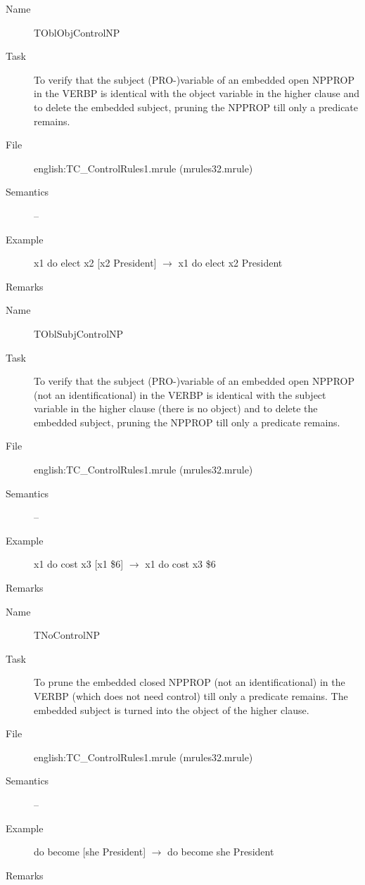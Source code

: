 \begin{description}
\vspace{1 cm}
\begin{description}
\item[Name] TOblObjControlNP
\item[Task] To verify that  the subject (PRO-)variable of an embedded 
open NPPROP in the VERBP is identical with the object variable in the 
higher clause 
and to delete the embedded subject, pruning the NPPROP till only a predicate 
remains. 
\item[File] english:TC\_ControlRules1.mrule (mrules32.mrule)
\item[Semantics] --
\item[Example] x1 do elect x2 [x2 President] $\rightarrow$ x1 do elect x2 
President
\item[Remarks] 
\end{description}

\vspace{1 cm}
\begin{description}
\item[Name]   TOblSubjControlNP
\item[Task] To verify that  the subject (PRO-)variable of an embedded 
open NPPROP (not an identificational) in the VERBP is 
identical with the subject variable in the higher clause (there is no object)
and to delete the embedded subject, pruning the NPPROP till only a predicate 
remains.
\item[File] english:TC\_ControlRules1.mrule (mrules32.mrule)
\item[Semantics] --
\item[Example] x1 do cost x3 [x1 \$6] $\rightarrow$ x1 do cost x3 \$6
\item[Remarks] 
\end{description}

\vspace{1 cm}
\begin{description}
\item[Name] TNoControlNP
\item[Task] To prune the embedded closed NPPROP (not an identificational) in 
the VERBP (which does not need control) 
till only a predicate remains. The embedded subject is turned into the object 
of the higher clause.
\item[File] english:TC\_ControlRules1.mrule (mrules32.mrule)
\item[Semantics] --
\item[Example] do become [she President] $\rightarrow$ do become she President
\item[Remarks] 
\end{description}


\end{description}
